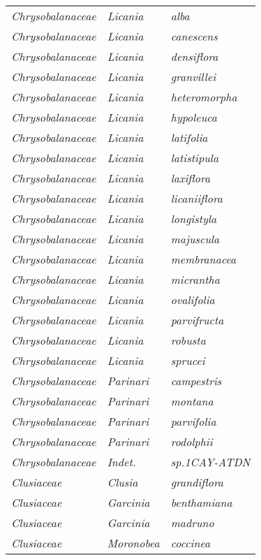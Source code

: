 \documentclass[fleqn,10pt]{ArtEcoFoG} %
\renewenvironment{table}{\begin{table*}}{\end{table*}\ignorespacesafterend}
\begin{document}
\begin{table}
\begin{tabular}[t]{lll}
\em{Chrysobalanaceae} & \em{Licania} & \em{alba}\\
\em{Chrysobalanaceae} & \em{Licania} & \em{canescens}\\
\em{Chrysobalanaceae} & \em{Licania} & \em{densiflora}\\
\addlinespace
\em{Chrysobalanaceae} & \em{Licania} & \em{granvillei}\\
\em{Chrysobalanaceae} & \em{Licania} & \em{heteromorpha}\\
\em{Chrysobalanaceae} & \em{Licania} & \em{hypoleuca}\\
\em{Chrysobalanaceae} & \em{Licania} & \em{latifolia}\\
\em{Chrysobalanaceae} & \em{Licania} & \em{latistipula}\\
\addlinespace
\em{Chrysobalanaceae} & \em{Licania} & \em{laxiflora}\\
\em{Chrysobalanaceae} & \em{Licania} & \em{licaniiflora}\\
\em{Chrysobalanaceae} & \em{Licania} & \em{longistyla}\\
\em{Chrysobalanaceae} & \em{Licania} & \em{majuscula}\\
\em{Chrysobalanaceae} & \em{Licania} & \em{membranacea}\\
\addlinespace
\em{Chrysobalanaceae} & \em{Licania} & \em{micrantha}\\
\em{Chrysobalanaceae} & \em{Licania} & \em{ovalifolia}\\
\em{Chrysobalanaceae} & \em{Licania} & \em{parvifructa}\\
\em{Chrysobalanaceae} & \em{Licania} & \em{robusta}\\
\em{Chrysobalanaceae} & \em{Licania} & \em{sprucei}\\
\addlinespace
\em{Chrysobalanaceae} & \em{Parinari} & \em{campestris}\\
\em{Chrysobalanaceae} & \em{Parinari} & \em{montana}\\
\em{Chrysobalanaceae} & \em{Parinari} & \em{parvifolia}\\
\em{Chrysobalanaceae} & \em{Parinari} & \em{rodolphii}\\
\em{Chrysobalanaceae} & \em{Indet.} & \em{sp.1CAY-ATDN}\\
\addlinespace
\em{Clusiaceae} & \em{Clusia} & \em{grandiflora}\\
\em{Clusiaceae} & \em{Garcinia} & \em{benthamiana}\\
\em{Clusiaceae} & \em{Garcinia} & \em{madruno}\\
\em{Clusiaceae} & \em{Moronobea} & \em{coccinea}\\

\end{tabular}
\end{table}
\end{document}

